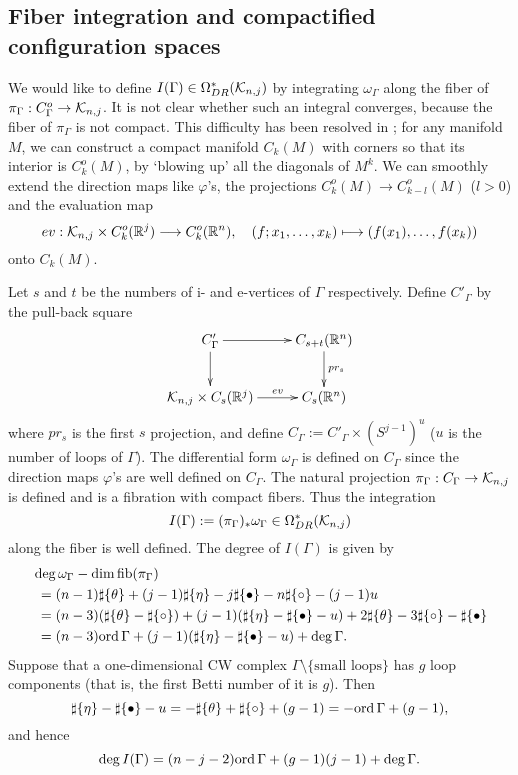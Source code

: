 \subsection{Fiber integration and compactified configuration spaces}\label{subsection_integral}
We would like to define $I(\Gamma ) \in \Omega^*_{DR} (\mathcal{K}_{n ,j})$ by integrating $\omega_{\Gamma}$ along the fiber
of $\pi_{\Gamma} : C^o_{\Gamma} \to \mathcal{K}_{n ,j}$.
It is not clear whether such an integral converges, because the fiber of $\pi_{\Gamma}$ is not compact.
This difficulty has been resolved in \cite{AxelrodSinger94,BottTaubes94}; for any manifold $M$, we can construct a
compact manifold $C_k (M)$ with corners so that its interior is $C^o_k (M)$, by `blowing up' all the diagonals of $M^k$.
We can smoothly extend the direction maps like $\varphi$'s, the projections $C^o_k (M) \to C^o_{k-l}(M)$ ($l>0$)
and the evaluation map
\[
 ev : \mathcal{K}_{n ,j} \times C^o_k (\mathbb{R}^j ) \longrightarrow C^o_k (\mathbb{R}^n ), \quad (f;x_1 ,\dots ,x_k ) \longmapsto
 (f(x_1 ), \dots ,f(x_k ))
\]
onto $C_k (M)$.


Let $s$ and $t$ be the numbers of i- and e-vertices of $\Gamma$ respectively.
Define $C'_{\Gamma}$ by the pull-back square
\[
 \xymatrix{
  C'_{\Gamma} \ar[r] \ar[d] & C_{s+t}(\R^n ) \ar[d]^-{pr_s} \\
  \emb{n}{j} \times C_s (\R^j ) \ar[r]^-{ev} & C_s (\R^n )
 }
\]
where $pr_s$ is the first $s$ projection, and define $C_{\Gamma} := C'_{\Gamma} \times (S^{j-1})^u$ ($u$ is the number of
loops of $\Gamma$).
The differential form $\omega_{\Gamma}$ is defined on $C_{\Gamma}$ since the direction maps $\varphi$'s are well defined
on $C_{\Gamma}$.
The natural projection $\pi_{\Gamma} : C_{\Gamma} \to \mathcal{K}_{n ,j}$ is defined and is a fibration with compact fibers.
Thus the integration
\[
 I(\Gamma ) :=(\pi_{\Gamma})_* \omega_{\Gamma} \in \Omega^*_{DR}(\mathcal{K}_{n ,j})
\]
along the fiber is well defined.
The degree of $I(\Gamma )$ is given by
\begin{align*}
 &\deg \omega_{\Gamma} -\dim \text{fib}(\pi_{\Gamma}) \\
 &\ =(n-1)\sharp \{ \theta \} + (j-1)\sharp \{ \eta \} -j\sharp \{ \bullet \} - n\sharp \{ \circ \} -(j-1)u \\
 &\ =(n-3)(\sharp \{ \theta \} - \sharp \{ \circ \}) + (j-1)(\sharp \{ \eta \} - \sharp \{ \bullet \}-u)
  + 2 \sharp \{ \theta \} - 3\sharp \{ \circ \} -\sharp \{ \bullet \} \\
 &\ =(n-3)\mathrm{ord}\, \Gamma + (j-1)(\sharp \{ \eta \} - \sharp \{ \bullet \}-u) + \deg \Gamma .
\end{align*}
Suppose that a one-dimensional CW complex $\Gamma \setminus \{ \text{small loops}\}$ has $g$ loop components (that is,
the first Betti number of it is $g$).
Then
\[
 \sharp \{ \eta \} - \sharp \{ \bullet \} -u = -\sharp \{ \theta \} + \sharp \{ \circ \}+(g-1) = -\mathrm{ord}\, \Gamma +(g-1),
\]
and hence
\[
 \deg I(\Gamma ) = (n-j-2)\mathrm{ord}\, \Gamma +(g-1)(j-1) + \deg \Gamma .
\]


